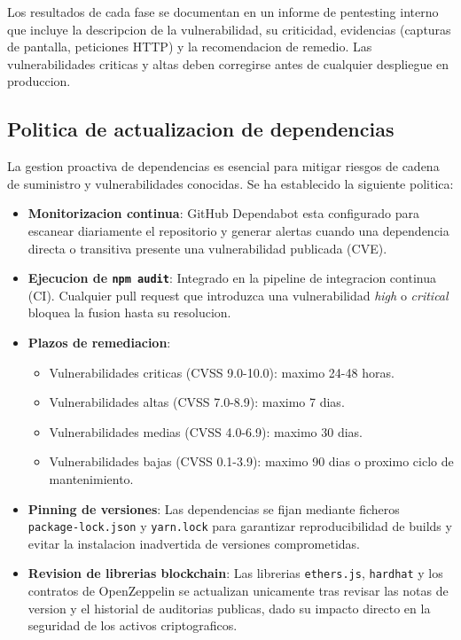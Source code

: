 \documentclass[11pt, a4paper]{article}
\begin{document}
Los resultados de cada fase se documentan en un informe de pentesting interno que incluye la descripcion de la vulnerabilidad, su criticidad, evidencias (capturas de pantalla, peticiones HTTP) y la recomendacion de remedio. Las vulnerabilidades criticas y altas deben corregirse antes de cualquier despliegue en produccion.

\subsection{Politica de actualizacion de dependencias}

La gestion proactiva de dependencias es esencial para mitigar riesgos de cadena de suministro y vulnerabilidades conocidas. Se ha establecido la siguiente politica:

\begin{itemize}
    \item \textbf{Monitorizacion continua}: GitHub Dependabot esta configurado para escanear diariamente el repositorio y generar alertas cuando una dependencia directa o transitiva presente una vulnerabilidad publicada (CVE).
    \item \textbf{Ejecucion de \texttt{npm audit}}: Integrado en la pipeline de integracion continua (CI). Cualquier pull request que introduzca una vulnerabilidad \textit{high} o \textit{critical} bloquea la fusion hasta su resolucion.
    \item \textbf{Plazos de remediacion}:
    \begin{itemize}
        \item Vulnerabilidades criticas (CVSS 9.0-10.0): maximo 24-48 horas.
        \item Vulnerabilidades altas (CVSS 7.0-8.9): maximo 7 dias.
        \item Vulnerabilidades medias (CVSS 4.0-6.9): maximo 30 dias.
        \item Vulnerabilidades bajas (CVSS 0.1-3.9): maximo 90 dias o proximo ciclo de mantenimiento.
    \end{itemize}
    \item \textbf{Pinning de versiones}: Las dependencias se fijan mediante ficheros \texttt{package-lock.json} y \texttt{yarn.lock} para garantizar reproducibilidad de builds y evitar la instalacion inadvertida de versiones comprometidas.
    \item \textbf{Revision de librerias blockchain}: Las librerias \texttt{ethers.js}, \texttt{hardhat} y los contratos de OpenZeppelin se actualizan unicamente tras revisar las notas de version y el historial de auditorias publicas, dado su impacto directo en la seguridad de los activos criptograficos.
\end{itemize}
\end{document}
